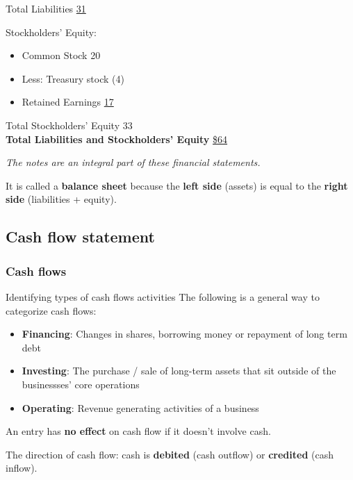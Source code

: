 \begin{tcolorbox}[colframe=black,colback=white,title=Example Balance Sheet (Classified by Current \& Non-current)]
\begin{multicols}{2}
        Total Liabilities \hfill \underline{31}

        Stockholders' Equity:
        \begin{itemize}
            \item Common Stock \hfill 20
            \item Less: Treasury stock \hfill (4)
            \item Retained Earnings \hfill \underline{17}
        \end{itemize}
        Total Stockholders' Equity \hfill 33\\
        {\textbf{Total Liabilities and Stockholders' Equity}} \hfill \underline{\underline{\$64}}
    \end{multicols}

    \vspace{1em}

    \textit{\footnotesize{The notes are an integral part of these financial statements.}}
\end{tcolorbox}

\normalsize

It is called a \textbf{balance sheet} because the \textbf{left side} (assets) is equal to the \textbf{right side} (liabilities + equity).

\subsection{Cash flow statement}

\subsubsection{Cash flows}

\begin{theorem}
    {Identifying types of cash flows activities}
    The following is a general way to categorize cash flows:
    \begin{itemize}
        \item \textbf{Financing}: Changes in shares, borrowing money or repayment of long term debt
        \item \textbf{Investing}: The purchase / sale of long-term assets that sit outside of the businessses' core operations
        \item \textbf{Operating}: Revenue generating activities of a business
    \end{itemize}
    An entry has \textbf{no effect} on cash flow if it doesn't involve cash.

    The direction of cash flow: cash is \textbf{debited} (cash outflow) or \textbf{credited} (cash inflow).
\end{theorem}

